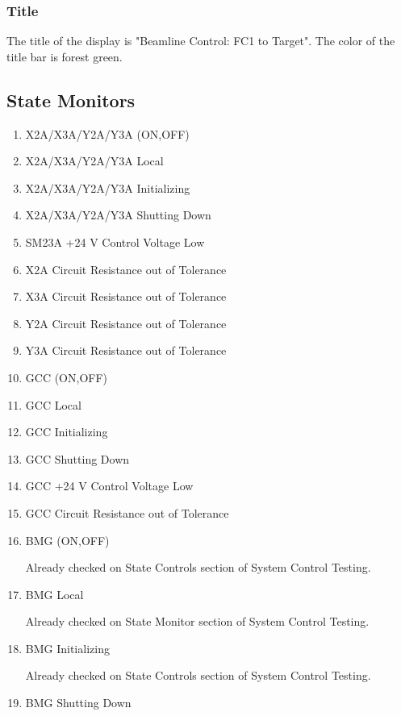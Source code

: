 \documentclass[11pt]{book}		%
\begin{document}
\subsubsection{Title}\label{sect:cyc-op-interface-status-terminal-display-contents-beamline-target-title}

The title of the display is "Beamline Control: FC1 to Target".  The color of the title bar is forest green.

\subsection{State Monitors}

\begin{enumerate}
 \item X2A/X3A/Y2A/Y3A (ON,OFF)
 \item X2A/X3A/Y2A/Y3A Local
 \item X2A/X3A/Y2A/Y3A Initializing
 \item X2A/X3A/Y2A/Y3A Shutting Down
 \item SM23A +24 V Control Voltage Low
 \item X2A Circuit Resistance out of Tolerance
 \item X3A Circuit Resistance out of Tolerance
 \item Y2A Circuit Resistance out of Tolerance
 \item Y3A Circuit Resistance out of Tolerance
 \item GCC (ON,OFF)
 \item GCC Local
 \item GCC Initializing
 \item GCC Shutting Down
 \item GCC +24 V Control Voltage Low
 \item GCC Circuit Resistance out of Tolerance
 \item BMG (ON,OFF)

\color{red}
Already checked on State Controls section of System Control Testing.
\color{black}

 \item BMG Local

\color{red}
Already checked on State Monitor section of System Control Testing.
\color{black}

 \item BMG Initializing

\color{red}
Already checked on State Controls section of System Control Testing.
\color{black}

 \item BMG Shutting Down


\end{enumerate}
\end{document}
